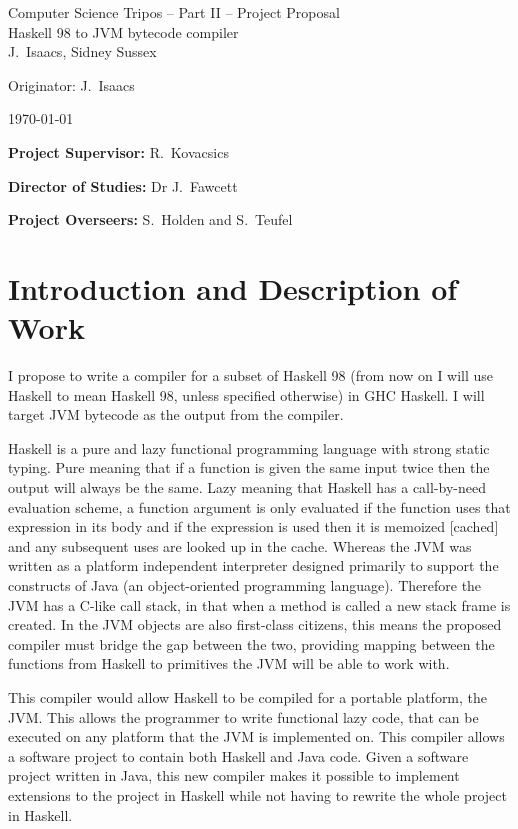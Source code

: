 \documentclass[12pt,a4paper,twoside]{article}
\begin{document}
\begin{center}
  \Large
  Computer Science Tripos -- Part II -- Project Proposal\\[4mm]
  \LARGE
  Haskell 98 to JVM bytecode compiler\\[4mm]

  \large
  J.~Isaacs, Sidney Sussex

  Originator: J.~Isaacs 

  \today
\end{center}

\vspace{5mm}

\textbf{Project Supervisor:} R.~Kovacsics

\textbf{Director of Studies:} Dr J.~Fawcett 

\textbf{Project Overseers:} S.~Holden and S.~Teufel



\section*{Introduction and Description of Work}

  I propose to write a compiler for a subset of Haskell 98 (from now on I will use Haskell to mean Haskell 98, unless specified otherwise)
  in GHC Haskell. I will target JVM bytecode as the output from the compiler.


  Haskell is a pure and lazy functional programming language with strong static typing. Pure meaning that
  if a function is given the same input twice then the output will always be the same. Lazy meaning that Haskell has a
  call-by-need evaluation scheme, a function argument is only evaluated if the function uses that expression in its body
  and if the expression is used then it is memoized [cached] and any subsequent uses are looked up in the cache.
  Whereas the JVM was written as a platform independent interpreter designed
  primarily to support the constructs of Java (an object-oriented programming language).
  Therefore the JVM has a C-like call stack, in that when a method is called a new stack frame is created. In the JVM objects are also first-class citizens, this means
  the proposed compiler must bridge the gap between the two, providing mapping between the functions from Haskell to primitives
  the JVM will be able to work with.

  This compiler would allow Haskell to be compiled for a portable platform, the JVM. This allows the programmer to
  write functional lazy code, that can be executed on any platform that the JVM is implemented on. This compiler allows a software project to contain both
  Haskell and Java code. Given a software project written in Java, this new compiler makes it possible to implement extensions to the project in Haskell
  while not having to rewrite the whole project in Haskell.
\end{document}

